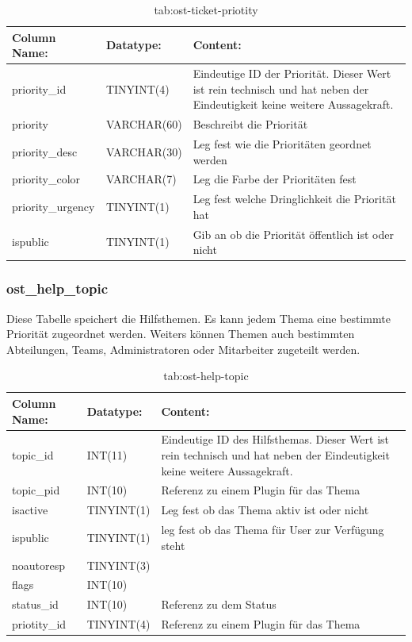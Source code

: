 \begin{table}[h]
	\begin{tabular}{|p{3.5cm}|p{4cm}|p{6.2cm}|}
		\hline
		\textbf{Column Name:} & \textbf{Datatype:} & \textbf{Content:}\\
		\hline
		priority\_id & TINYINT(4) & Eindeutige ID der Priorität. Dieser Wert ist rein technisch und hat  neben der Eindeutigkeit keine weitere Aussagekraft.\\
		\hline
		priority & VARCHAR(60) & Beschreibt die Priorität\\
		\hline
		priority\_desc & VARCHAR(30) & Leg fest wie die Prioritäten geordnet werden \\
		\hline
		priority\_color & VARCHAR(7) & Leg die Farbe der Prioritäten fest\\
		\hline
		priority\_urgency & TINYINT(1) & Leg fest welche Dringlichkeit die Priorität hat \\
		\hline
		ispublic & TINYINT(1) & Gib an ob die Priorität öffentlich ist oder nicht\\
		\hline
	\end{tabular}
	\caption{tab:ost-ticket-priotity}
\end{table}
\label{tab:ost_ticket_priotity}

\newpage

\subsubsection{ost\_help\_topic}

Diese Tabelle speichert die Hilfsthemen. Es kann jedem Thema eine bestimmte Priorität zugeordnet werden. Weiters können Themen auch bestimmten Abteilungen, Teams, Administratoren oder Mitarbeiter zugeteilt werden.   

\begin{table}[h]
	\begin{tabular}{|p{3.5cm}|p{4cm}|p{6.2cm}|}
		\hline
		\textbf{Column Name:} & \textbf{Datatype:} & \textbf{Content:}\\
		\hline
		topic\_id & INT(11) & Eindeutige ID des Hilfsthemas. Dieser Wert ist rein technisch und hat  neben der Eindeutigkeit keine weitere Aussagekraft.\\
		\hline
		topic\_pid & INT(10) & Referenz zu einem Plugin für das Thema\\
		\hline
		isactive & TINYINT(1) & Leg fest ob das Thema aktiv ist oder nicht \\
		\hline
		ispublic & TINYINT(1) & leg fest ob das Thema für User zur Verfügung steht\\
		\hline
		noautoresp & TINYINT(3) & \\
		\hline
		flags & INT(10) & \\
		\hline
		status\_id & INT(10) & Referenz zu dem Status \\
		\hline
		priotity\_id & TINYINT(4) & Referenz zu einem Plugin für das Thema\\
		\hline
			\end{tabular}
			\caption{tab:ost-help-topic}
		\end{table}
		\label{tab:ost_help_topic}
		\newpage
		
